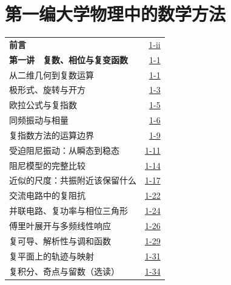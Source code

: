 \section*{第一编\quad 大学物理中的数学方法}
\begin{longtable}{@{}p{}r@{}}
\textbf{前言}&\href{course-page:1:2}{1-ii}\\[2pt]
\textbf{第一讲　复数、相位与复变函数}&\href{course-page:1:6}{1-1}\\[2pt]
\hspace{1em}从二维几何到复数运算&\href{course-page:1:6}{1-1}\\[2pt]
\hspace{1em}极形式、旋转与开方&\href{course-page:1:8}{1-3}\\[2pt]
\hspace{1em}欧拉公式与复指数&\href{course-page:1:10}{1-5}\\[2pt]
\hspace{1em}同频振动与相量&\href{course-page:1:11}{1-6}\\[2pt]
\hspace{1em}复指数方法的运算边界&\href{course-page:1:14}{1-9}\\[2pt]
\hspace{1em}受迫阻尼振动：从瞬态到稳态&\href{course-page:1:16}{1-11}\\[2pt]
\hspace{1em}阻尼模型的完整比较&\href{course-page:1:19}{1-14}\\[2pt]
\hspace{1em}近似的尺度：共振附近该保留什么&\href{course-page:1:22}{1-17}\\[2pt]
\hspace{1em}交流电路中的复阻抗&\href{course-page:1:27}{1-22}\\[2pt]
\hspace{1em}并联电路、复功率与相位三角形&\href{course-page:1:29}{1-24}\\[2pt]
\hspace{1em}傅里叶展开与多频线性响应&\href{course-page:1:31}{1-26}\\[2pt]
\hspace{1em}复可导、解析性与调和函数&\href{course-page:1:34}{1-29}\\[2pt]
\hspace{1em}复平面上的轨迹与映射&\href{course-page:1:36}{1-31}\\[2pt]
\hspace{1em}复积分、奇点与留数（选读）&\href{course-page:1:39}{1-34}\\[2pt]

\end{longtable}
